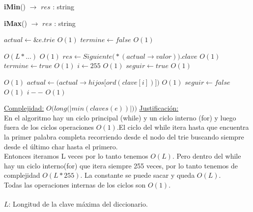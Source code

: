 \begin{Algoritmos}
\begin{algorithm}[H]{\textbf{iMin}() $\to$ $res$ : string}
\begin{algorithmic}
{        }
      \end{algorithmic}
\end{algorithm}

\begin{algorithm}[H]{\textbf{iMax}() $\to$ $res$ : string}
      \begin{algorithmic}
        \State $actual \gets \&e.trie$ \Comment $O(1)$
        \State $termine \gets false$ \Comment $O(1)$

         \Comment $O(L * ...)$
           \Comment $O(1)$
            \State $res \gets Siguiente\big(*(actual \to valor)\big).clave$ \Comment $O(1)$
            \State $termine \gets true $   \Comment $O(1)$
          \Else
            \State $i \gets 255$ \Comment $O(1)$
            \State $seguir \gets true$ \Comment $O(1)$
            \State $ $

               \Comment $O(1)$
                \State $actual \gets \big(actual \to hijos\big[ord(clave[i])\big]\big)$ \Comment $O(1)$
                \State $seguir \gets false$ \Comment $O(1)$
              \EndIf
              \State $i--$ \Comment $O(1)$
            \EndWhile
          \EndIf
        \EndWhile

        \medskip
        \Statex \underline{Complejidad:} {$O\big(long\big(|min(claves(e))|\big)\big)$}
        \Statex \underline{Justificación:} {\\
\quad\quad En el algoritmo hay un ciclo principal (while)  y un ciclo interno (for) y luego fuera de los ciclos operaciones $O(1)$.El ciclo del while itera hasta que encuentra la primer palabra completa recorriendo desde el nodo del trie buscando siempre desde el último char hasta el primero. \\
\quad\quad Entonces iteramos L veces por lo tanto tenemos $O(L)$. Pero dentro del while hay un ciclo interno(for) que itera siempre 255 veces, por lo tanto tenemos de complejidad $O(L*255)$. La constante se puede sacar y queda $O(L)$.\\
\quad\quad Todas las operaciones internas de los ciclos son $O(1)$.\\
\\
\quad\quad $L$: Longitud de la clave máxima del diccionario.
        }
      \end{algorithmic}
\end{algorithm}

\end{Algoritmos}
